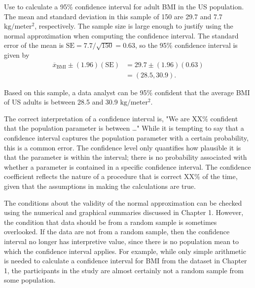 \begin{spacing}{1.5}
\begin{example}{Use  to calculate a 95\% confidence interval for adult BMI in the US population. \label{exNhanesBmi}}
	The mean and standard deviation in this sample of 150 are 29.7 and 7.7 $\text{kg}/\text{meter}{^2}$, respectively.  The sample size is large enough to justify using the normal approximation when computing the confidence interval.  The standard error of the mean is $\text{SE} = 7.7/\sqrt{150} = 0.63$, so the 95\% confidence interval is given by 
\begin{align*}
	\overline{x}_{\text{BMI}} \pm (1.96)(\text{SE}) &= 29.7 \pm (1.96)(0.63) \\
	&= (28.5, 30.9).
\end{align*}	
	
	Based on this sample, a data analyst can be 95\% confident that the average BMI of US adults is between 28.5 and 30.9 $\text{kg}/\text{meter}{^2}$.
\end{example}

The correct interpretation of a confidence interval is, "We are XX\% confident that the population parameter is between \dots" While it is tempting to say that a confidence interval captures the population parameter with a certain probability, this is a common error. The confidence level only quantifies how plausible it is that the parameter is within the interval; there is no probability associated with whether a parameter is contained in a specific confidence interval. The confidence coefficient reflects the nature of a procedure that is correct XX\% of the time, given that the assumptions in making the calculations are true.

The conditions about the validity of the normal approximation can be checked using the numerical and graphical summaries discussed in Chapter 1. However, the condition that data should be from a random sample is sometimes overlooked. If the data are not from a random sample, then the confidence interval no longer has interpretive value, since there is no population mean to which the confidence interval applies. For example, while only simple arithmetic is needed to calculate a confidence interval for BMI from the  dataset in Chapter 1, the participants in the study are almost certainly not a random sample from some population. 





\end{spacing}
